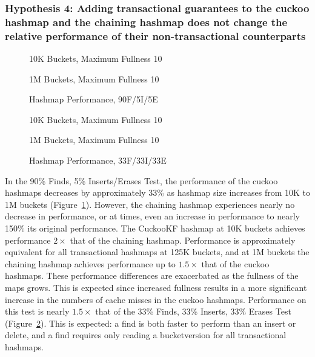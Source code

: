 \subsubsection{Hypothesis 4: Adding transactional guarantees to the cuckoo hashmap and the chaining hashmap does not change the relative performance of their non-transactional counterparts}

\begin{figure}[H]
    \centering
    \begin{minipage}{0.75\textwidth}
        \caption*{10K Buckets, Maximum Fullness 10}
        \vspace{12pt}
    \end{minipage}
    \begin{minipage}{0.75\textwidth}
        \caption*{1M Buckets, Maximum Fullness 10}
    \end{minipage}
	\caption{Hashmap Performance, 90F/5I/5E}
	\label{fig:hm_90}
\end{figure}

\begin{figure}[H]
    \centering
    \begin{minipage}{0.75\textwidth}
        \caption*{10K Buckets, Maximum Fullness 10}
        \vspace{12pt}
    \end{minipage}
    \begin{minipage}{0.75\textwidth}
        \caption*{1M Buckets, Maximum Fullness 10}
    \end{minipage}
	\caption{Hashmap Performance, 33F/33I/33E}
	\label{fig:hm_33}
\end{figure}

In the 90\% Finds, 5\% Inserts/Erases Test, the performance of the cuckoo hashmaps decreases by approximately 33\% as hashmap size increases from 10K to 1M buckets (Figure~\ref{fig:hm_90}). However, the chaining hashmap experiences nearly no decrease in performance, or at times, even an increase in performance to nearly 150\% its original performance. The CuckooKF hashmap at 10K buckets achieves performance $2\times$ that of the chaining hashmap. Performance is approximately equivalent for all transactional hashmaps at 125K buckets, and at 1M buckets the chaining hashmap achieves performance up to $1.5\times$ that of the cuckoo hashmaps. These performance differences are exacerbated as the fullness of the maps grows. This is expected since increased fullness results in a more significant increase in the numbers of cache misses in the cuckoo hashmaps.
 Performance on this test is nearly $1.5\times$ that of the 33\% Finds, 33\% Inserts, 33\% Erases Test (Figure~\ref{fig:hm_33}). This is expected: a find is both faster to perform than an insert or delete, and a find requires only reading a bucketversion for all transactional hashmaps.


